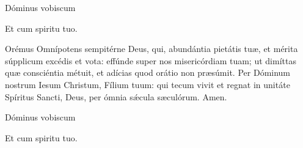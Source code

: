 


\rubric{\Vbar} Dóminus vobiscum

\rubric{\Rbar} Et cum spiritu tuo.

Orémus
Omnípotens sempitérne Deus, qui, abundántia pietátis tuæ, et mérita súpplicum excédis et vota: effúnde super nos misericórdiam tuam; ut dimíttas quæ consciéntia métuit, et adícias quod orátio non præsúmit. Per Dóminum nostrum Iesum Christum, Fílium tuum: qui tecum vivit et regnat in unitáte Spíritus Sancti, Deus, per ómnia sǽcula sæculórum.\rubric{\Rbar} Amen.

\rubric{\Vbar} Dóminus vobiscum

\rubric{\Rbar} Et cum spiritu tuo.

